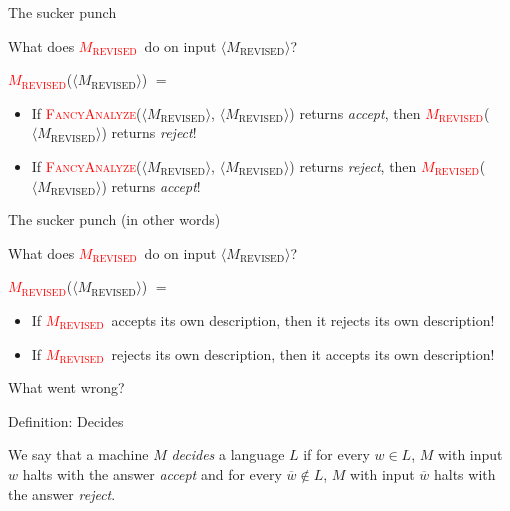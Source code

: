 \documentclass[12pt,compress]{beamer}
\newcommand{\func}[1]{\textcolor{red}{\textsc{#1}}}
\newcommand{\MREV}[0]{\func{$M_{\text{REVISED}}$}}
\newcommand{\strMREV}[0]{$\langle M_{\text{REVISED}} \rangle$}
\begin{document}
\begin{frame}{The sucker punch}

  What does \MREV~do on input \strMREV?

  \vskip 0.25in

  \MREV(\strMREV) $=$

  \begin{itemize}

  \item If \func{FancyAnalyze}(\strMREV, \strMREV) returns \textit{accept}, then
    \MREV(\strMREV) returns \textit{reject}!

  \item If \func{FancyAnalyze}(\strMREV, \strMREV) returns \textit{reject}, then
    \MREV(\strMREV) returns \textit{accept}!

  \end{itemize}

\end{frame}

\begin{frame}{The sucker punch (in other words)}

  What does \MREV~do on input \strMREV?

  \vskip 0.25in

  \MREV(\strMREV) $=$

  \begin{itemize}

  \item If \MREV~accepts its own description, then it rejects its own
    description!

  \item If \MREV~rejects its own description, then it accepts its own
    description!

  \end{itemize}

\end{frame}

\begin{frame}{What went wrong?}

  

\end{frame}

\begin{frame}{Definition: Decides}

  We say that a machine $M$ \textit{decides} a language $L$ if for every $w
  \in L$, $M$ with input $w$ halts with the answer \textit{accept} and for
  every $\overline{w} \notin L$, $M$ with input $\overline{w}$ halts
  with the answer \textit{reject}.

\end{frame}
\end{document}
